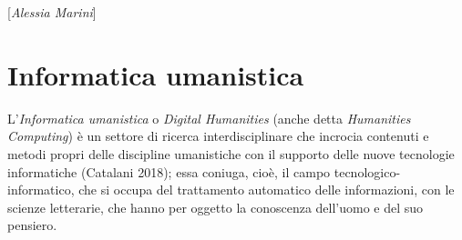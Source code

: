 {{[}\emph{Alessia Marini}{]}



\chapter{Informatica umanistica}

L'\emph{Informatica umanistica} o \emph{Digital Humanities} (anche detta
\emph{Humanities Computing}) è un settore di ricerca interdisciplinare
che incrocia contenuti e metodi propri delle discipline umanistiche con
il supporto delle nuove tecnologie informatiche (Catalani 2018); essa
coniuga, cioè, il campo tecnologico-informatico, che si occupa del
trattamento automatico delle informazioni, con le scienze letterarie,
che hanno per oggetto la conoscenza dell'uomo e del suo pensiero.

}
